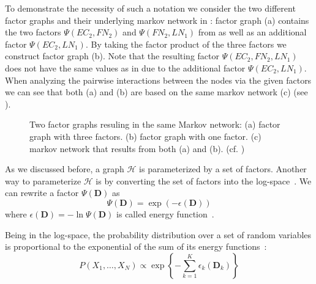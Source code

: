 To demonstrate the necessity of such a notation we consider the two different \glspl{factor graph} and their underlying \gls{markov network} in :
\Gls{factor graph} (a) contains the two factors $\Psi(EC_2,FN_2)$ and $\Psi(FN_2,LN_1)$ from  as well as an additional \gls{factor} $\Psi(EC_2,LN_1)$.
By taking the \gls{factor product} of the three \glspl{factor} we construct \gls{factor graph} (b).
Note that the resulting \gls{factor} $\Psi(EC_2,FN_2,LN_1)$ does not have the same values as in  due to the additional factor $\Psi(EC_2,LN_1)$.
When analyzing the pairwise interactions between the nodes via the given \glspl{factor} we can see that both (a) and (b) are based on the same \gls{markov network} (c) (see ).

\begin{figure}[t]
\resizebox{\linewidth}{!}{%
  
}
\caption[Two factor graphs resuling in the same Markov network]{%
  Two factor graphs resuling in the same Markov network:
  (a) \Gls{factor graph} with three \glspl{factor}.
  (b) \Gls{factor graph} with one \gls{factor}.
  (c) \Gls{markov network} that results from both (a) and (b). (cf. \citep{koller2009probabilistic})
}
\label{fig:example-factor-graph}
\end{figure}

\bigskip

As we discussed before, a graph $\mathcal{H}$ is parameterized by a set of \glspl{factor}.
Another way to parameterize $\mathcal{H}$ is by converting the set of \glspl{factor} into the log-space~\citep{koller2009probabilistic}.
We can rewrite a factor $\Psi(\mathbf{D})$ as
\begin{equation*}
  \label{equ:energy-function}
  \Psi(\mathbf{D}) = \exp(-\epsilon(\mathbf{D}))
\end{equation*}
where $\epsilon(\mathbf{D})=-\ln\Psi(\mathbf{D})$ is called \gls{energy function}~\citep{koller2009probabilistic}.

Being in the log-space, the \gls{probability distribution} over a set of \glspl{random variable} is proportional to the exponential of the sum of its energy functions~\citep{koller2009probabilistic}:
\begin{equation}
  \label{equ:p-energy-function}
  P\left(X_1,\dots,X_N\right) \propto \exp\left\{-\sum_{k=1}^K\epsilon_k\left(\mathbf{D}_k\right)\right\}
\end{equation}

